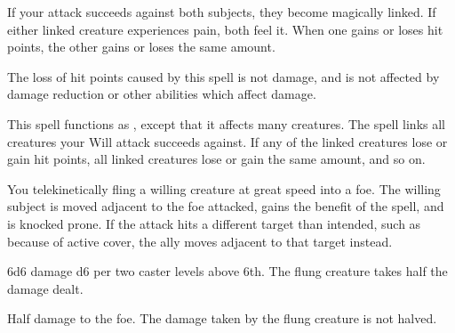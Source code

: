 \spelldur{\durshort}
\begin{spelleffect}
    If your attack succeeds against both subjects, they become magically linked. If either linked creature experiences pain, both feel it. When one gains or loses hit points, the other gains or loses the same amount.
\end{spelleffect}
\begin{spellnotes}
    The loss of hit points caused by this spell is not damage, and is not affected by damage reduction or other abilities which affect damage.
\end{spellnotes}

\begin{spelleffect}
    This spell functions as , except that it affects many creatures. The spell links all creatures your Will attack succeeds against. If any of the linked creatures lose or gain hit points, all linked creatures lose or gain the same amount, and so on.
\end{spelleffect}

\begin{spelleffect}
    You telekinetically fling a willing creature at great speed into a foe. The willing subject is moved adjacent to the foe attacked, gains the benefit of the  spell, and is knocked prone. If the attack hits a different target than intended, such as because of active cover, the ally moves adjacent to that target instead.
\end{spelleffect}
\begin{spellsuccess}
    6d6 damage \add d6 per two caster levels above 6th. The flung creature takes half the damage dealt.
\end{spellsuccess}
\begin{spellfailure}
    Half damage to the foe. The damage taken by the flung creature is not halved.
\end{spellfailure}

